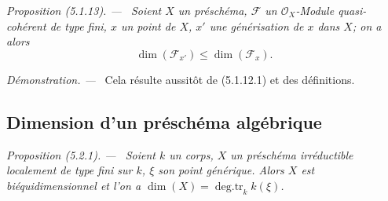\documentclass[10pt,oneside]{book}
\newcommand{\oldpage}[2][]{%
  \setcounter{footnote}{0}%
  \marginpar{\scriptsize\textbf{#1}~|~#2}\ignorespaces}
\newenvironment{proposition}[1][]{%
  \par\medskip\noindent\itshape Proposition (#1). ---\ }{\par}
\newenvironment{proof}{%
  \par\medskip\noindent\textit{Démonstration. ---\ }}{\par}
\begin{document}
\begin{proposition}[5.1.13]
\label{IV.2.5.1.13-fr}
Soient $X$ un préschéma, $\mathcal F$ un $\mathcal O_X$-Module
quasi-cohérent de type fini, $x$ un point de $X$, $x'$ une générisation de
$x$ dans $X$; on a alors
\begin{equation}
\dim(\mathcal F_{x'})\leq\dim(\mathcal F_x).
\tag{5.1.13.1}\label{IV.2.5.1.13.1-fr}
\end{equation}
\end{proposition}

\begin{proof}
Cela résulte aussitôt de (5.1.12.1) et des définitions.
\end{proof}

\subsection{Dimension d'un préschéma algébrique}

\oldpage[IV-2]{90}

\begin{proposition}[5.2.1]
\label{IV.2.5.2.1-fr}
Soient $k$ un corps, $X$ un préschéma irréductible localement de type fini sur
$k$, $\xi$ son point générique. Alors $X$ est biéquidimensionnel et l'on a
$\dim(X)=\operatorname{deg.tr}_k k(\xi)$.
\end{proposition}
\end{document}
